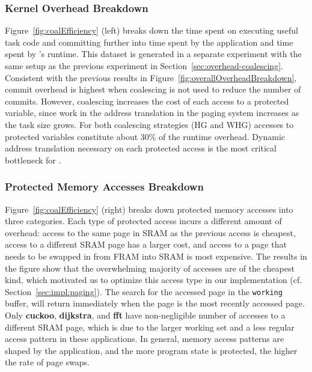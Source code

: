 
\subsubsection{\sys Kernel Overhead Breakdown}

Figure~\ref{fig:coalEfficiency} (left) breaks down the time spent on executing
useful task code and committing further into time spent by the application and
time spent by \sys's runtime.
%
This dataset is generated in a separate experiment with the same setup as the
previous experiment in Section~\ref{sec:overhead-coalescing}.
%
Consistent with the previous results in
Figure~\ref{fig:overallOverheadBreakdown}, commit overhead is highest when
coalescing is not used to reduce the number of commits.
%
However, coalescing increases the cost of each access to a protected variable,
since work in the address translation in the paging system increases as the
task size grows.
%
For both coalescing strategies (HG and WHG) accesses to protected variables
constitute about 30\% of the runtime overhead. Dynamic address translation
necessary on each protected access is the most critical bottleneck for \sys.


\subsubsection{Protected Memory Accesses Breakdown}

Figure~\ref{fig:coalEfficiency} (right) breaks down protected memory accesses
into three categories.
%
Each type of protected access incurs a different amount of overhead: access to
the same page in SRAM as the previous access is cheapest, access to a different
SRAM page has a larger cost, and access to a page that needs to be swapped in
from FRAM into SRAM is most expensive.
%
The results in the figure show that the overwhelming majority of accesses are
of the cheapest kind, which motivated us to optimize this access type in our
implementation (cf. Section~\ref{sec:impl:paging}).
%
The search for the accessed page in the \texttt{working} buffer,
will return immediately when the page is the most recently accessed page.
%
Only \textbf{cuckoo}, \textbf{dijkstra}, and \textbf{fft} have non-negligible
number of accesses to a different SRAM page, which is due to the larger working
set and a less regular access pattern in these applications.
%
In general, memory access patterns are shaped by the application, and the more
program state is protected, the higher the rate of page swaps.

